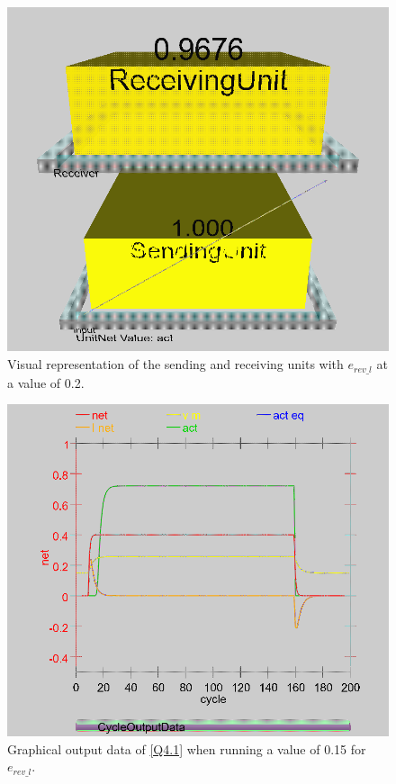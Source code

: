 \begin{multicols}{2}
\begin{figure}[H]
\centering
\includegraphics[scale=0.225]{Media/Main/EQ1/2.4.S2.png}
\caption{Visual representation of the sending and receiving units with $e_{rev\_l}$ at a value of 0.2.}
\label{Q4.3}
\end{figure}

\begin{figure}[H]
\centering
\includegraphics[scale=0.3]{Media/Main/EQ1/2.4.S0G.png}
\caption{Graphical output data of \cref{Q4.1} when running a value of 0.15 for $e_{rev\_l}$.}
\label{Q4.4}
\end{figure}


\end{multicols}

